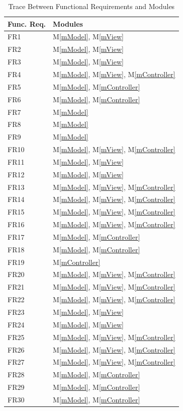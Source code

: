 \documentclass[12pt, titlepage]{article}
\newcommand{\mref}[1]{M\ref{#1}}
\begin{document}
\begin{table}[H]
\centering
\begin{tabular}{p{} p{}}
\toprule
\textbf{Func. Req.} & \textbf{Modules}\\
\midrule
FR1 & \mref{mModel}, \mref{mView}\\
FR2 & \mref{mModel}, \mref{mView}\\
FR3 & \mref{mModel}, \mref{mView}\\
FR4 & \mref{mModel}, \mref{mView}, \mref{mController}\\
FR5 & \mref{mModel}, \mref{mController}\\
FR6 & \mref{mModel}, \mref{mController}\\
FR7 & \mref{mModel}\\
FR8 & \mref{mModel}\\
FR9 & \mref{mModel}\\
FR10 & \mref{mModel}, \mref{mView}, \mref{mController}\\
FR11 & \mref{mModel}, \mref{mView}\\
FR12 & \mref{mModel}, \mref{mView}\\
FR13 &\mref{mModel}, \mref{mView}, \mref{mController}\\
FR14 & \mref{mModel}, \mref{mView}, \mref{mController}\\
FR15 & \mref{mModel}, \mref{mView}, \mref{mController}\\
FR16 & \mref{mModel}, \mref{mView}, \mref{mController}\\
FR17 & \mref{mModel}, \mref{mController}\\
FR18 & \mref{mModel}, \mref{mController}\\
FR19 & \mref{mController}\\
FR20 & \mref{mModel}, \mref{mView}, \mref{mController}\\
FR21 & \mref{mModel}, \mref{mView}, \mref{mController}\\
FR22 & \mref{mModel}, \mref{mView}, \mref{mController}\\
FR23 & \mref{mModel}, \mref{mView}\\
FR24 & \mref{mModel}, \mref{mView}\\
FR25 & \mref{mModel}, \mref{mView}, \mref{mController}\\
FR26 & \mref{mModel}, \mref{mView}, \mref{mController}\\
FR27 & \mref{mModel}, \mref{mView}, \mref{mController}\\
FR28 & \mref{mModel}, \mref{mController}\\
FR29 & \mref{mModel}, \mref{mController}\\
FR30 & \mref{mModel}, \mref{mController}\\
\bottomrule
\end{tabular}
\caption{Trace Between Functional Requirements and Modules}
\label{TblRT}
\end{table}
\end{document}
